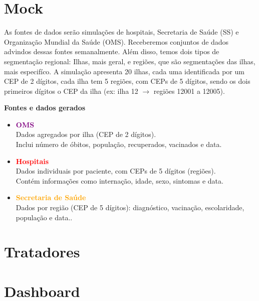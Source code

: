 \documentclass[a4paper,12pt]{article}
\begin{document}
\section{Mock}

As fontes de dados serão simulações de hospitais,  Secretaria de Saúde (SS) e Organização Mundial da Saúde (OMS). Receberemos conjuntos de dados advindos dessas fontes semanalmente. Além disso, temos dois tipos de segmentação regional: Ilhas, mais geral, e regiões, que são segmentações das ilhas, mais especifíco. A simulação apresenta 20 ilhas, cada uma identificada por um CEP de 2 dígitos, cada ilha tem 5 regiões, com CEPs de 5 dígitos, sendo os dois primeiros dígitos o CEP da ilha (ex: ilha 12 $\rightarrow$ regiões 12001 a 12005).

\vspace{0.5cm}

\textbf{Fontes e dados gerados}

\begin{itemize}
    \item \textcolor{purple}{\textbf{OMS}}\\
    Dados agregados por ilha (CEP de 2 dígitos).\\
    Inclui número de óbitos, população, recuperados, vacinados e data.
    
    \vspace{0.5em}
    
    \item \textcolor{red}{\textbf{Hospitais }}\\
    Dados individuais por paciente, com CEPs de 5 dígitos (regiões).\\
    Contém informações como internação, idade, sexo, sintomas e data.
    
    \vspace{0.5em}
    
    \item \textcolor{orange}{\textbf{Secretaria de Saúde}}\\
    Dados por região (CEP de 5 dígitos): diagnóstico, vacinação, escolaridade, população e data..
\end{itemize}


\section{Tratadores}

\section{Dashboard}
\end{document}
